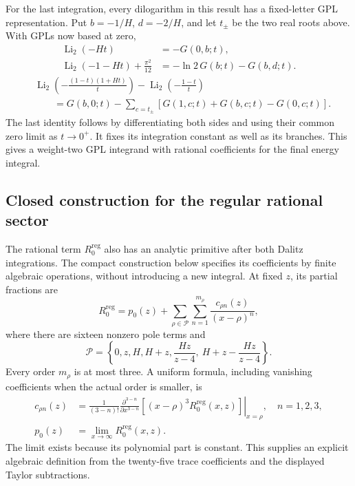 For the last integration, every dilogarithm in this result has a
fixed-letter GPL representation. Put $b=-1/H$, $d=-2/H$, and
let $t_\pm$ be the two real roots above. With GPLs now based at zero,
\begin{align}
 \operatorname{Li}_2(-Ht)&=-G(0,b;t),\\
 \operatorname{Li}_2(-1-Ht)+\frac{\pi^2}{12}
       &=-\ln2\,G(b;t)-G(b,d;t).
\end{align}
\begin{equation}
\begin{aligned}
 &\operatorname{Li}_2\left(-\frac{(1-t)(1+Ht)}t\right)
 -\operatorname{Li}_2\left(-\frac{1-t}t\right)\\
 &\qquad=G(b,0;t)
          -\sum_{c=t_\pm}[G(1,c;t)+G(b,c;t)-G(0,c;t)].
\end{aligned}
\end{equation}
The last identity follows by differentiating both sides and using
their common zero limit as $t\to0^+$. It fixes its integration
constant as well as its branches. This gives a weight-two GPL
integrand with rational coefficients for the final energy integral.

\subsection{Closed construction for the regular rational sector}
The rational term $R_0^{\mathrm{reg}}$ also has an analytic primitive
after both Dalitz integrations. The compact construction below
specifies its coefficients by finite algebraic operations, without
introducing a new integral. At fixed $z$, its partial fractions are
\begin{equation}
 R_0^{\mathrm{reg}}=p_0(z)+
          \sum_{\rho\in\mathcal P}\sum_{n=1}^{m_\rho}
               \frac{c_{\rho n}(z)}{(x-\rho)^n},
\end{equation}
where there are sixteen nonzero pole terms and
\begin{equation}
 \mathcal P=\left\{0,z,H,H+z,
              \frac{Hz}{z-4},\ H+z-\frac{Hz}{z-4}\right\}.
\end{equation}
Every order $m_\rho$ is at most three. A uniform formula, including
vanishing coefficients when the actual order is smaller, is
\begin{align}
 c_{\rho n}(z)&=\left.\frac{1}{(3-n)!}
   \frac{\partial^{3-n}}{\partial x^{3-n}}
       [(x-\rho)^3R_0^{\mathrm{reg}}(x,z)]\right|_{x=\rho},
       \quad n=1,2,3,\\
 p_0(z)&=\lim_{x\to\infty}R_0^{\mathrm{reg}}(x,z).
\end{align}
The limit exists because its polynomial part is constant.
This supplies an explicit algebraic definition from the twenty-five
trace coefficients and the displayed Taylor subtractions.

